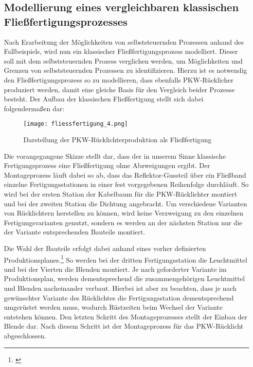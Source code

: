\subsection{Modellierung eines vergleichbaren klassischen Fließfertigungsprozesses}
\label{Modellierung}

Nach Erarbeitung der Möglichkeiten von selbststeuernden Prozessen anhand des
Fallbeispiels, wird nun ein klassischer Fließfertigungsprozess modelliert.
Dieser soll mit dem selbststeuernden Prozess verglichen werden, um Möglichkeiten
und Grenzen von selbststeuernden Prozessen zu identifizieren. Hierzu ist es
notwendig den Fließfertigungsprozess so zu modellieren, dass ebenfalls
PKW-Rücklicher produziert werden, damit eine gleiche Basis für den Vergleich
beider Prozesse besteht. Der Aufbau der klassischen Fließfertigung stellt sich
dabei folgendermaßen dar:

\begin{figure}[htb] 
\centering
\texttt{[image: fliessfertigung\_4.png]}
\caption[Montagestation]{Darstellung der PKW-Rücklichterproduktion als Fließfertigung\protect\footnotemark}
\label{fig:Fliessfertigung}
\end{figure}

Die vorangegangene Skizze stellt dar, dass der in unserem Sinne klassische
Fertigungsprozess eine Fließfertigung ohne Abzweigungen ergibt. Der
Montageprozess läuft dabei so ab, dass das Reflektor-Gussteil über ein Fließband
einzelne Fertigungsstationen in einer fest vorgegebenen Reihenfolge durchläuft.
So wird bei der ersten Station der Kabelbaum für die PKW-Rücklichter montiert
und bei der zweiten Station die Dichtung angebracht. Um verschiedene Varianten
von Rücklichtern herstellen zu können, wird keine Verzweigung zu den einzelnen
Fertigungsvarianten genutzt, sondern es werden an der nächsten Station nur die
der Variante entsprechenden Bauteile montiert.

Die Wahl der Bauteile erfolgt dabei anhand eines vorher definierten
Produktionsplanes.\footnote{\citet[S.~331]{arnold2008}} So werden bei der
dritten Fertigungsstation die Leuchtmittel und bei der Vierten die Blenden montiert. Je nach geforderter Variante im
Produktionsplan, werden dementsprechend die zusammengehörigen Leuchtmittel und
Blenden nacheinander verbaut. Hierbei ist aber zu beachten, dass je nach
gewünschter Variante des Rücklichtes die Fertigungsstation dementsprechend
umgerüstet werden muss, wodurch Rüstzeiten beim Wechsel der Variante entstehen
können. Den letzten Schritt des Montageprozesses stellt der Einbau der Blende
dar. Nach diesem Schritt ist der Montageprozess für das PKW-Rücklicht
abgeschlossen.
 